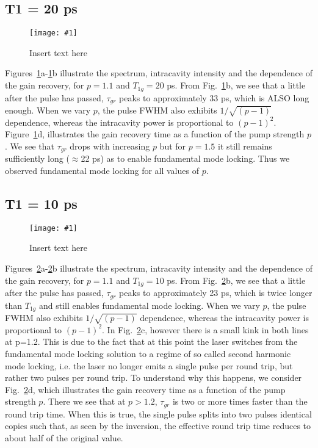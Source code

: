 \documentclass[preprint,secnumarabic,amssymb, nobibnotes, aip, prd]{revtex4-1}
\newcommand{\includegraphicsXL}[1]{\texttt{[image: \#1]}}
\begin{document}
\subsection{T1 = 20 ps}
\begin{figure}[H]
	\centering
	\includegraphicsXL{IMGS/T1g-20ps}
	\caption{Insert text here}
	\label{fig:T120}
\end{figure}


Figures~\ref{fig:T120}a-\ref{fig:T120}b illustrate the spectrum, intracavity intensity and the dependence of the gain recovery, for $p =1.1$ and $T_{1g} = 20$ ps. From Fig.~\ref{fig:T120}b, we see that a little after the pulse has passed, $\tau_{gr}$ peaks to approximately 33 ps, which is ALSO long enough. When we vary $p$, the pulse FWHM also exhibits $1/\sqrt{(p-1)}$ dependence, whereas the intracavity power is proportional to $(p-1)^2$. Figure~\ref{fig:T120}d, illustrates the gain recovery time as a function of the pump strength $p$. We see that $\tau_{gr}$ drops with increasing $p$ but for $p=1.5$ it  still remains sufficiently long ($\approx$22 ps) as to enable fundamental mode locking. Thus we observed fundamental mode locking for all values of $p$.
\newpage
\subsection{T1 = 10 ps}
\begin{figure}[H]
	\centering
	\includegraphicsXL{IMGS/T1g-10ps}
	\caption{Insert text here}
	\label{fig:T110}
\end{figure}
Figures~\ref{fig:T110}a-\ref{fig:T110}b illustrate the spectrum, intracavity intensity and the dependence of the gain recovery, for $p =1.1$ and $T_{1g} = 10$ ps. From Fig.~\ref{fig:T110}b, we see that a little after the pulse has passed, $\tau_{gr}$ peaks to approximately 23 ps, which is twice longer than $T_{1g}$ and still enables fundamental mode locking. When we vary $p$, the pulse FWHM also exhibits $1/\sqrt{(p-1)}$ dependence, whereas the intracavity power is proportional to $(p-1)^2$. In Fig.~\ref{fig:T110}c, however there is a small kink in both lines at p=1.2. This is due to the fact that at this point the laser switches from the fundamental mode locking solution to a regime of so called second harmonic mode locking, i.e. the laser no longer emits a single pulse per round trip, but rather two pulses per round trip. To understand why this happens, we consider  Fig.~\ref{fig:T110}d, which illustrates the gain recovery time as a function of the pump strength $p$. There we see that at $p>1.2$, $\tau_{gr}$ is two or more times faster than the round trip time. When this is true, the single pulse splits into two pulses identical copies such that, as seen by the inversion, the effective round trip time reduces to about half of the original value. 

\end{document}

